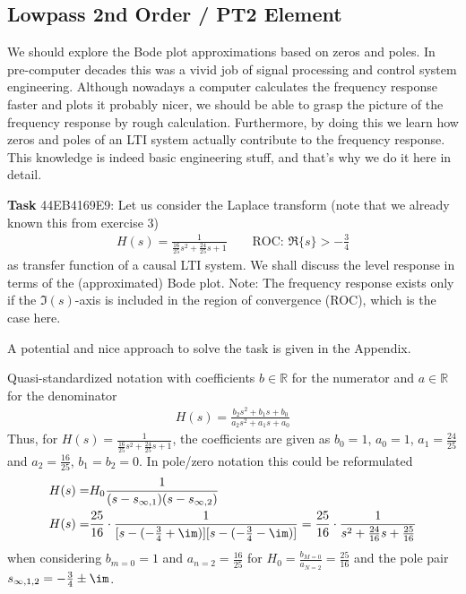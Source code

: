 \newpage
\subsection{Lowpass 2nd Order / PT2 Element}
\label{sec:44EB4169E9}
\begin{Ziel}
We should explore the Bode plot approximations based on zeros and poles.
In pre-computer decades this was a vivid job of signal
processing and control system engineering.
Although nowadays a computer calculates the frequency response faster and plots it
probably nicer, we should be able to grasp the picture of the frequency response
by rough calculation. Furthermore, by doing this we learn how zeros and poles
of an LTI system actually  contribute to the frequency response. This knowledge
is indeed basic engineering stuff, and that's why we do it here in detail.
\end{Ziel}
\textbf{Task} {\tiny 44EB4169E9}:
Let us consider the Laplace transform (note that we already known this from
exercise 3)
\begin{align}
\label{eq:H_ODE}
H(s) = \frac{1}{\frac{16}{25} s^2 + \frac{24}{25} s + 1}\qquad\text{ROC: }
\Re\{s\}>-\frac{3}{4}
\end{align}
as transfer function of a causal LTI system.
%
We shall discuss the level response in terms of the (approximated) Bode plot.
%
Note: The frequency response exists only if the $\Im(s)$-axis is included
in the region of convergence (ROC), which is the case here.

\begin{Werkzeug}
A potential and nice approach to solve the task is given in the Appendix.
\end{Werkzeug}
\begin{Ansatz}
Quasi-standardized notation with coefficients $b\in\mathbb{R}$ for the numerator and
$a\in\mathbb{R}$ for the denominator
\begin{align}
H(s) = \frac{b_2 s^2+b_1 s + b_0}{a_2 s^2+a_1 s +a_0}
\end{align}
Thus, for
$H(s) = \frac{1}{\frac{16}{25} s^2 + \frac{24}{25} s + 1}$,
the coefficients are given as
$b_0 = 1$, $a_0=1$, $a_1 = \frac{24}{25}$ and
$a_2 = \frac{16}{25}$, $b_1=b_2=0$.
%
In pole/zero notation this could be reformulated
\begin{align}
H(s) =& H_0 \frac{1}{(s-s_{\infty,1}) (s-s_{\infty,2})}\\
H(s) =& \frac{25}{16}\cdot\frac{1}{[s-(-\frac{3}{4}+\im)] [s-(-\frac{3}{4}-\im)]}
=
\frac{25}{16}\cdot\frac{1}{s^2 + \frac{24}{16} s  + \frac{25}{16}}
\end{align}
when considering $b_{m=0} = 1$ and $a_{n=2}=\frac{16}{25}$ for
$H_0 = \frac{b_{M=0}}{a_{N=2}}=\frac{25}{16}$ and the pole pair
$s_{\infty,1,2} = -\frac{3}{4} \pm \im$.
\end{Ansatz}

